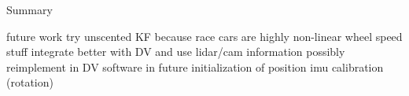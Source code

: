 Summary

future work
try unscented KF because race cars are highly non-linear
wheel speed stuff
integrate better with DV and use lidar/cam information
possibly reimplement in DV software in future
initialization of position
imu calibration (rotation)
